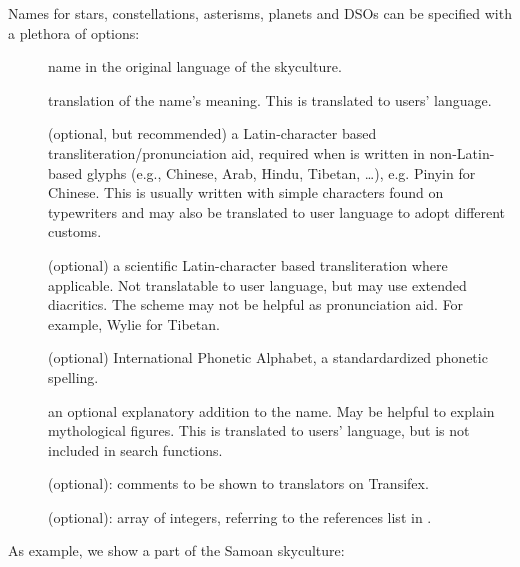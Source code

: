 Names for stars, constellations, asterisms, planets and DSOs can be specified with a plethora of options:
\begin{description}
    \item[] name in the original language of the skyculture. 
    \item[] translation of the name's meaning. This is translated to users' language.
    \item[] (optional, but recommended) a Latin-character based transliteration/pronunciation aid, 
    required when  is written in non-Latin-based glyphs (e.g., Chinese, Arab, Hindu, Tibetan, \ldots), 
    e.g. Pinyin for Chinese. This is usually written with simple characters found on typewriters and may also be translated to user language to adopt different customs.
    \item[] (optional) a scientific Latin-character based transliteration where applicable. Not translatable to user language, but may use extended diacritics.
	The scheme may not be helpful as pronunciation aid. For example, Wylie for Tibetan.
    \item[] (optional) International Phonetic Alphabet, a standardardized phonetic spelling.
    \item[] an optional explanatory addition to the name.  May be helpful to explain mythological figures. 
	This is translated to users' language, but is not included in search functions.
    \item[] (optional):  comments to be shown to translators on Transifex.    
    \item[] (optional): array of integers, referring to the references list in . 
\end{description}


As example, we show a part of the Samoan skyculture:

